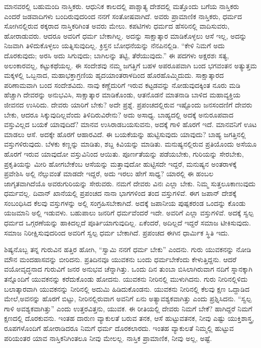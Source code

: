ಮಾನವರಲ್ಲಿ ಬಹುಮಂದಿ ನಾಸ್ತಿಕರು. ಆಧುನಿಕ ಕಾಲದಲ್ಲಿ ಪಾಶ್ಚಾತ್ಯ ದೇಶದಲ್ಲಿ ಮತ್ತೊಂದು ಬಗೆಯ ನಾಸ್ತಿಕರು ಎಂದರೆ ಜಡವಾದಿಗಳು ಬಂದಿರುವುದರಿಂದ ನನಗೆ ಸಂತೋಷವಾಗಿದೆ. ಅವರು ಪ್ರಾಮಾಣಿಕ ನಾಸ್ತಿಕರು, ಧರ್ಮದ ಸೋಗಿನಲ್ಲಿರುವ ಠಕ್ಕರಾದ ನಾಸ್ತಿಕರಿಗಿಂತ ಅವರು ಮೇಲು. ಕಪಟಿಗಳು ಧರ್ಮದ ಹೆಸರಿನಲ್ಲಿ ವಾದಿಸುವರು, ಹೋರಾಡುವರು. ಆದರೂ ಅವರಿಗೆ ಧರ್ಮ ಬೇಕಾಗಿಲ್ಲ. ಅದನ್ನು ಸಾಕ್ಷಾತ್ಕಾರ ಮಾಡಿಕೊಳ್ಳಲು ಆಸೆ ಇಲ್ಲ, ಅದನ್ನು ನಿಜವಾಗಿ ತಿಳಿದುಕೊಳ್ಳಲು ಯತ್ನಿಸುವುದಿಲ್ಲ. ಕ್ರಿಸ್ತನ ಬೋಧನೆಯನ್ನು ನೆನಪಿನಲ್ಲಿಡಿ. “ಕೇಳಿ ನಿಮಗೆ ಅದು ದೊರಕುವುದು; ಅರಸಿ ಅದು ಸಿಗುವುದು; ಬಾಗಿಲನ್ನು ತಟ್ಟಿ, ತೆರೆಯುವುದು.” ಈ ಪದಗಳು ಅಕ್ಷರಶಃ ಸತ್ಯ, ಅಲಂಕಾರವಲ್ಲ, ಕಟ್ಟು\break ಕಥೆಯಲ್ಲ. ಈ ಸಂದೇಶವು ನಮ್ಮ ಜಗತ್ತಿಗೆ ಬಹಳ ಅಪರೂಪವಾಗಿ ಬಂದ ಭಗವಂತನ ಅತ್ಯುತ್ತಮ ಮಕ್ಕಳಲ್ಲಿ ಒಬ್ಬನಾದ, ಮಹಾಭಕ್ತಾಗ್ರಣಿಯ ಹೃದಯಾಂತರಾಳದಿಂದ ಹೊರ\-ಹೊಮ್ಮಿದುದು. ಸಾಕ್ಷಾತ್ಕಾರದ ಪರಿಣಾಮವಾಗಿ ಬಂದ ಸಂದೇಶವಿದು. ನಾವು ಕಣ್ಣೆದುರಿಗೆ ಇರುವ ಕಟ್ಟಡವನ್ನು ನೋಡುವುದಕ್ಕಿಂತ ನೂರು ಮಡಿ ಹೆಚ್ಚಾಗಿ ದೇವರನ್ನು ಅನುಭವಿಸಿ, ಸಾಕ್ಷಾತ್ಕಾರ ಮಾಡಿಕೊಂಡು, ಆತನೊಡನೆ ಮಾತನಾಡಿ ಬಾಳಿದ ಮಹಾವ್ಯಕ್ತಿಯ ಜೀವನದ ಉಸಿರಿದು. ದೇವರು ಯಾರಿಗೆ ಬೇಕು? ಅದೇ ಪ್ರಶ್ನೆ. ಪ್ರಪಂಚದಲ್ಲಿರುವ ಇಷ್ಟೊಂದು ಜನಸಂದಣಿಗೆ ದೇವರು ಬೇಕು, ಆದರೂ ಸಿಕ್ಕುವುದಿಲ್ಲವೆಂದು ತಿಳಿದಿರುವಿರೇನು? ಅದು ಅಸಾಧ್ಯ. ಬಾಹ್ಯದಲ್ಲಿ ಅದಕ್ಕೆ ಅನುರೂಪವಾದ ವಸ್ತುವಿಲ್ಲದ ಬಯಕೆ ಯಾವುದಿದೆ? ಮಾನವ ಉಸಿರಾಡಬಯಸುವನು, ಅದಕ್ಕೆ ಗಾಳಿ ಹೊರಗೆ ಇದೆ. ಮಾನವನಿಗೆ ಊಟ ಮಾಡಲು ಆಸೆ. ಅದಕ್ಕೇ ಹೊರಗೆ ಆಹಾರವಿದೆ. ಈ ಬಯಕೆಯನ್ನು ಹುಟ್ಟಿಸುವುದು ಯಾವುದು? ಬಾಹ್ಯ ಜಗತ್ತಿನಲ್ಲಿ ವಸ್ತುಗಳಿರುವುದು. ಬೆಳಕು ಕಣ್ಣನ್ನು ಮಾಡಿತು, ಶಬ್ದ ಕಿವಿಯನ್ನು ಮಾಡಿತು. ಮನುಷ್ಯನಲ್ಲಿರುವ ಪ್ರತಿಯೊಂದು ಅಸೆಯೂ ಹೊರಗೆ ಇರುವ ಯಾವುದೋ ವಸ್ತುವಿನಿಂದ ಆಯಿತು. ಪೂರ್ಣತೆಯನ್ನು ಪಡೆಯಬೇಕು, ಗುರಿಯನ್ನು ಸೇರಬೇಕು, ಪ್ರಕೃತಿಯನ್ನು ಮೀರಿ ಹೋಗಬೇಕೆಂಬ ಆಸೆಯನ್ನು ಮತ್ತಾವುದೋ ಹುಟ್ಟಿಸದೇ ಇದ್ದರೆ, ಮನುಷ್ಯನ ಅಂತರಾಳಕ್ಕೆ ಪ್ರವೇಶಿಸಿ ಅಲ್ಲಿ ನೆಲ್ಸುವಂತೆ ಮಾಡದೇ ಇದ್ದರೆ, ಅದು ಇರಲು ಹೇಗೆ ಸಾಧ್ಯ? ಯಾರಲ್ಲಿ ಈ ಹಂಬಲ ಜಾಗೃತವಾಗಿದೆಯೊ ಅವರು\break ಗುರಿಯನ್ನು ಸೇರುವರು. ನಮಗೆ ದೇವರು ವಿನಃ ಎಲ್ಲಾ ಬೇಕು. ನಿಮ್ಮ ಸುತ್ತಲೂ\break ಕಾಣುವುದು ಧರ್ಮವಲ್ಲ. ದಿವಾನ್​ ಖಾನೆಯಲ್ಲಿ ಪ್ರಪಂಚದ ನಾನಾ ಭಾಗಗಳಿಂದ ತಂದ ವಸ್ತುಗಳಿವೆ. ಈಗ ಜಪಾನ್​ ದೇಶಕ್ಕೆ ಸಂಬಂಧಿಸಿದ ಕೆಲವು ವಸ್ತುಗಳನ್ನು ಅಲ್ಲಿ ಸಂಗ್ರಹಿಸ\-ಬೇಕಾಗಿದೆ. ಅದಕ್ಕೆ ಜಪಾನೀಯ ಪುಷ್ಪಕರಂಡ ಒಂದನ್ನು ಕೊಂಡು ಯಜಮಾನಿ ಅಲ್ಲಿ ಇಡುವಳು. ಬಹುಪಾಲು ಜನರಿಗೆ ಧರ್ಮವೆಂದರೆ ಇದೇ. ಅವರಿಗೆ ಎಲ್ಲಾ ವಸ್ತುಗಳಿವೆ. ಅದಕ್ಕೆ ಸ್ವಲ್ಪ ಧರ್ಮದ ಒಗ್ಗರಣೆಯನ್ನು ಹಾಕಿದಲ್ಲದೆ ಪೂರ್ತಿಯಾಗುವುದಿಲ್ಲ. ಏಕೆಂದರೆ, ಅದಿಲ್ಲದೆ ಇದ್ದರೆ ಸಮಾಜ ಟೀಕಿಸುವುದು. ಸಮಾಜ ನಿರೀಕ್ಷಿಸುವುದರಿಂದ ಅವರಿಗೆ ಸ್ವಲ್ಪ ಧರ್ಮ ಬೇಕಾಗಿದೆ. ಪ್ರಪಂಚದ ಈಗಿನ ಧಾರ್ಮಿಕ ಸ್ಥಿತಿ ಇದು.

ಶಿಷ್ಯನೊಬ್ಬ ತನ್ನ ಗುರುವಿನ ಹತ್ತಿರ ಹೋಗಿ, “ಸ್ವಾಮಿ ನನಗೆ ಧರ್ಮ ಬೇಕು” ಎಂದನು. ಗುರು ಯುವಕನನ್ನು ನೋಡಿ ಮೌನ ಮಂದಹಾಸವನ್ನು ಬೀರಿದನು. ಪ್ರತಿದಿನವೂ ಯುವಕನು ಬಂದು ಧರ್ಮಬೇಕೆಂದು ಕೇಳುತ್ತಿದ್ದನು. ಆದರೆ ವಯೋವೃದ್ಧನಾದ ಗುರುವಿಗೆ ಜನರ ಅನುಭವ ಚೆನ್ನಾಗಿತ್ತು. ಒಂದು ದಿನ ತುಂಬಾ ಬಿಸಿಲಾಗಿರುವಾಗ ನದಿಗೆ ಸ್ನಾನಕ್ಕಾಗಿ ತನ್ನೊಂದಿಗೆ ಯುವಕನನ್ನು ಕರೆದುಕೊಂಡು ಹೋದನು. ಯುವಕನು ನೀರಿನಲ್ಲಿ ಮುಳುಗಿದನು. ಗುರು ನೀರಿನಲ್ಲಿಳಿದು ಬಲಾತ್ಕಾರವಾಗಿ ಯುವಕನನ್ನು ನೀರಿನಲ್ಲಿ ಅದುಮಿ ಹಿಡಿದುಕೊಂಡನು. ಯುವಕನು ನೀರಿನಲ್ಲಿ ಕೆಲವು ಕ್ಷಣ ಒದ್ದಾಡಿದ ಮೇಲೆ,\break ಅವನನ್ನು ಹೊರಗೆ ಬಿಟ್ಟು, ನೀರಿನಲ್ಲಿರುವಾಗ ಅವನಿಗೆ ಏನು ಅತ್ಯಾವಶ್ಯಕವಾಗಿತ್ತು ಎಂದು ಪ್ರಶ್ನಿಸಿದನು. “ಸ್ವಲ್ಪ ಗಾಳಿ ಅವಶ್ಯಕವಾಗಿತ್ತು” ಎಂದು ಉತ್ತರವಿತ್ತನು, ಯುವಕ. ಈ ರೀತಿಯಲ್ಲಿ ದೇವರು ನಿಮಗೆ ಬೇಕೆ? ಹಾಗಿದ್ದರೆ ನಿಮಗೆ ಕ್ಷಣದಲ್ಲಿ ದೊರಕುವನು. ಇಂತಹ ದಾರುಣ ವ್ಯಾಕುಲತೆ ಬರುವ ತನಕ, ಆಸೆ ಹುಟ್ಟುವತನಕ, ನೀವು ಎಷ್ಟು ಯುಕ್ತಿಶಾಸ್ತ್ರ, ರೂಪಗಳೊಂದಿಗೆ ಹೋರಾಡಿದರೂ ನಿಮಗೆ ಧರ್ಮ ದೊರಕಲಾರದು. ಇಂತಹ ವ್ಯಾಕುಲತೆ ನಿಮ್ಮಲ್ಲಿ ಹುಟ್ಟುವ ಪರಿಯಂತರ ಯಾವ ನಾಸ್ತಿಕನಿಗಿಂತಲೂ ನೀವು ಮೇಲಲ್ಲ. ನಾಸ್ತಿಕ ಪ್ರಾಮಾಣಿಕ, ನೀವು ಅಲ್ಲ, ಅಷ್ಟೆ.

